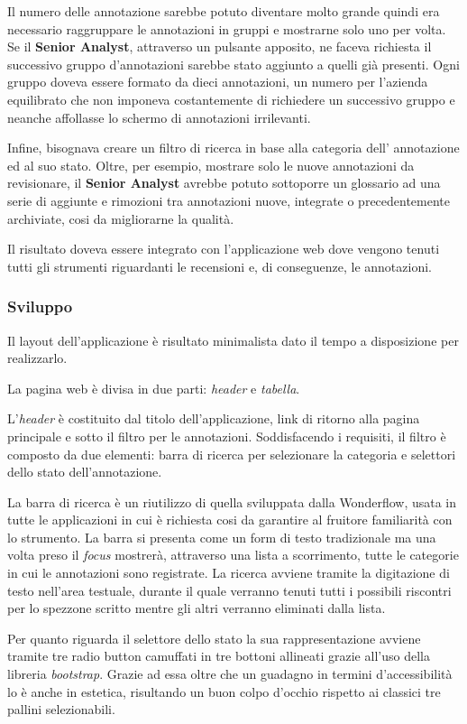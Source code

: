 Il numero delle annotazione sarebbe potuto diventare molto grande quindi era
necessario raggruppare le annotazioni in gruppi e mostrarne solo uno per volta.
Se il \textbf{Senior Analyst}, attraverso un pulsante apposito, ne faceva
richiesta il successivo gruppo d'annotazioni sarebbe stato aggiunto a quelli già
presenti. Ogni gruppo doveva essere formato da dieci annotazioni, un numero per
l'azienda equilibrato che non imponeva costantemente di richiedere un successivo
gruppo e neanche affollasse lo schermo di annotazioni irrilevanti.

Infine, bisognava creare un filtro di ricerca in base alla categoria dell'
annotazione ed al suo stato. Oltre, per esempio, mostrare solo le nuove
annotazioni da revisionare, il \textbf{Senior Analyst} avrebbe potuto sottoporre
un glossario ad una serie di aggiunte e rimozioni tra annotazioni nuove,
integrate o precedentemente archiviate, cosi da migliorarne la qualità.

Il risultato doveva essere integrato con l'applicazione web dove vengono tenuti
tutti gli strumenti riguardanti le recensioni e, di conseguenze, le annotazioni.

\subsubsection{Sviluppo}
Il layout dell'applicazione è risultato minimalista dato il tempo a disposizione
per realizzarlo.

La pagina web è divisa in due parti: \textit{header} e \textit{tabella}.

L'\textit{header} è costituito dal titolo dell'applicazione, link di ritorno
alla pagina principale e sotto il filtro per le annotazioni. Soddisfacendo i
requisiti, il filtro è composto da due elementi: barra di ricerca per
selezionare la categoria e selettori dello stato dell'annotazione.

La barra di ricerca è un riutilizzo di quella sviluppata dalla Wonderflow, usata
in tutte le applicazioni in cui è richiesta cosi da garantire al fruitore
familiarità con lo strumento. La barra si presenta come un form di testo
tradizionale ma una volta preso il \textit{focus} mostrerà, attraverso una lista
a scorrimento, tutte le categorie in cui le annotazioni sono registrate. La
ricerca avviene tramite la digitazione di testo nell'area testuale, durante
il quale verranno tenuti tutti i possibili riscontri per lo spezzone scritto
mentre gli altri verranno eliminati dalla lista.

Per quanto riguarda il selettore dello stato la sua rappresentazione avviene
tramite tre radio button camuffati in tre bottoni allineati grazie all'uso
della libreria \textit{bootstrap}. Grazie ad essa oltre che un guadagno in
termini d'accessibilità lo è anche in estetica, risultando un buon colpo
d'occhio rispetto ai classici tre pallini selezionabili.

